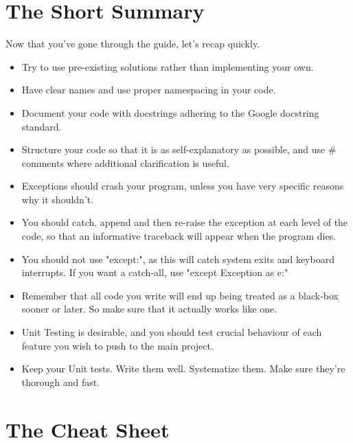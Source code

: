 \documentclass[10pt,a4paper]{article}
\begin{document}
\section{The Short Summary}
Now that you've gone through the guide, let's recap quickly.

\begin{itemize}
\item Try to use pre-existing solutions rather than implementing your own.
\item Have clear names and use proper namespacing in your code. 
\item Document your code with docstrings adhering to the Google docstring standard.
\item Structure your code so that it is as self-explanatory as possible, and use \# comments where additional clarification is useful.
\item Exceptions should crash your program, unless you have very specific reasons why it shouldn't.
\item You should catch, append and then re-raise the exception at each level of the code, so that an informative traceback will appear when the program dies.
\item You should not use "except:", as this will catch system exits and keyboard interrupts. If you want a catch-all, use "except Exception as e:"
\item Remember that all code you write will end up being treated as a black-box sooner or later. So make sure that it actually works like one.
\item Unit Testing is desirable, and you should test crucial behaviour of each feature you wish to push to the main project.
\item Keep your Unit tests. Write them well. Systematize them. Make sure they're thorough and fast.
\end{itemize}

\section{The Cheat Sheet}
\end{document}
